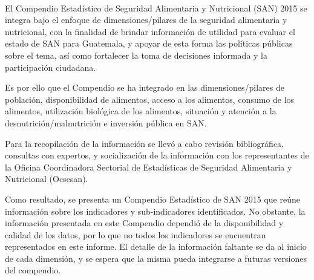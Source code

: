 $\ $

\cleardoublepage



\indent{}
\\


El Compendio Estadístico de Seguridad Alimentaria y Nutricional (SAN) 2015 se integra bajo el enfoque de dimensiones/pilares de la seguridad alimentaria y nutricional, con la finalidad de brindar información de utilidad para evaluar el estado de SAN para Guatemala, y apoyar de esta forma las políticas públicas sobre el tema, así como fortalecer la toma de decisiones informada y la participación ciudadana. 

Es por ello que el Compendio se ha integrado en las dimensiones/pilares de población, disponibilidad de alimentos, acceso a los alimentos, consumo de los alimentos, utilización biológica de los alimentos,  situación y atención a la desnutrición/malnutrición e inversión pública en SAN.

Para la recopilación de la información se llevó a cabo revisión bibliográfica, consultas con expertos, y socialización de la información con los representantes de la Oficina Coordinadora Sectorial de Estadísticas de Seguridad Alimentaria y Nutricional (Ocsesan).

Como resultado, se presenta un Compendio Estadístico de SAN 2015 que reúne información sobre los indicadores y sub-indicadores identificados. No obstante, la información presentada en este Compendio dependió de la disponibilidad y calidad de los datos, por lo que no todos los indicadores se encuentran representados en este informe. El detalle de la información faltante se da al inicio de cada dimensión, y se espera que la misma pueda integrarse a futuras versiones del compendio.\\[16mm]

